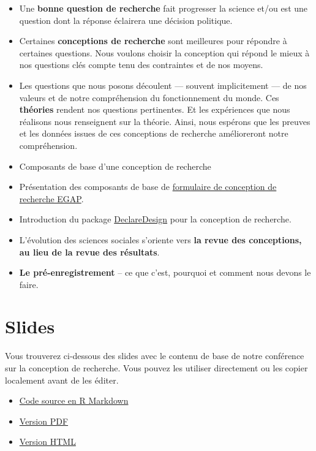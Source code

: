 \documentclass[
  12pt,
]{book}
\begin{document}
\begin{itemize}
\item
  Une \textbf{bonne question de recherche} fait progresser la science et/ou est une question dont la réponse éclairera une décision politique.
\item
  Certaines \textbf{conceptions de recherche} sont meilleures pour répondre à certaines questions. Nous voulons choisir la conception qui répond le mieux à nos questions clés compte tenu des contraintes et de nos moyens.
\item
  Les questions que nous posons découlent --- souvent implicitement --- de nos valeurs et de notre compréhension du fonctionnement du monde. Ces \textbf{théories} rendent nos questions pertinentes. Et les expériences que nous réalisons nous renseignent sur la théorie. Ainsi, nous espérons que les preuves et les données issues de ces conceptions de recherche amélioreront notre compréhension.
\item
  Composants de base d'une conception de recherche
\item
  Présentation des composants de base de \href{https://egap.github.io/learningdays-resources/Exercises/design-form.html}{formulaire de conception de recherche EGAP}.
\item
  Introduction du package \href{https://declaredesign.org}{DeclareDesign} pour la conception de recherche.
\item
  L'évolution des sciences sociales s'oriente vers \textbf{la revue des conceptions, au lieu de la revue des résultats}.
\item
  \textbf{Le pré-enregistrement} -- ce que c'est, pourquoi et comment nous devons le faire.
\end{itemize}

\hypertarget{slides}{%
\section{Slides}\label{slides}}

Vous trouverez ci-dessous des slides avec le contenu de base de notre conférence sur la conception de recherche. Vous pouvez les utiliser directement ou les copier localement avant de les éditer.

\begin{itemize}
\item
  \href{https://egap.github.io/learningdays-resources/Slides/researchdesignform-slides.Rmd}{Code source en R Markdown}
\item
  \href{https://egap.github.io/learningdays-resources/Slides/researchdesignform-slides.pdf}{Version PDF}
\item
  \href{https://egap.github.io/learningdays-resources/Slides/researchdesignform-slides.html}{Version HTML}
\end{itemize}
\end{document}
